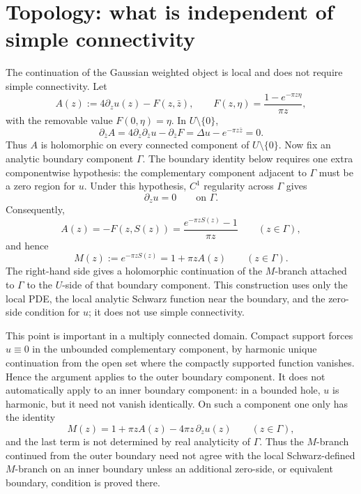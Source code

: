\documentclass[11pt]{article}
\newcommand{\pbar}{\partial_{\bar z}}
\newcommand{\1}{\mathbf 1}
\begin{document}
\section{Topology: what is independent of simple connectivity}

The continuation of the Gaussian weighted object is local and does not require simple
connectivity. Let
\[
  A(z):=4\partial_z u(z)-F(z,\bar z),
  \qquad
  F(z,\eta)=\frac{1-e^{-\pi z\eta}}{\pi z},
\]
with the removable value \(F(0,\eta)=\eta\). In \(U\setminus\{0\}\),
\[
  \pbar A=4\partial_z\pbar u-\pbar F
  =
  \Delta u-e^{-\pi z\bar z}
  =
  0.
\]
Thus \(A\) is holomorphic on every connected component of \(U\setminus\{0\}\). Now fix an
analytic boundary component \(\Gamma\). The boundary identity below requires one extra
componentwise hypothesis: the complementary component adjacent to \(\Gamma\) must be a
zero region for \(u\). Under this hypothesis, \(C^1\) regularity across \(\Gamma\) gives
\[
  \partial_z u=0\qquad\text{on }\Gamma.
\]
Consequently,
\[
  A(z)=-F(z,S(z))
  =
  \frac{e^{-\pi zS(z)}-1}{\pi z}
  \qquad (z\in\Gamma),
\]
and hence
\begin{equation}\label{eq:M-pde-continuation}
  M(z):=e^{-\pi zS(z)}=1+\pi zA(z)
  \qquad (z\in\Gamma).
\end{equation}
The right-hand side gives a holomorphic continuation of the \(M\)-branch attached to
\(\Gamma\) to the \(U\)-side of that boundary component. This construction uses only the
local PDE, the local analytic Schwarz function near the boundary, and the zero-side
condition for \(u\); it does not use simple connectivity.

This point is important in a multiply connected domain. Compact support forces \(u\equiv0\)
in the unbounded complementary component, by harmonic unique continuation from the open
set where the compactly supported function vanishes. Hence the argument applies to the
outer boundary component. It does not automatically apply to an inner boundary component:
in a bounded hole, \(u\) is harmonic, but it need not vanish identically. On such a
component one only has the identity
\[
  M(z)=1+\pi zA(z)-4\pi z\,\partial_z u(z)
  \qquad (z\in\Gamma),
\]
and the last term is not determined by real analyticity of \(\Gamma\). Thus the
\(M\)-branch continued from the outer boundary need not agree with the local
Schwarz-defined \(M\)-branch on an inner boundary unless an additional zero-side, or
equivalent boundary, condition is proved there.
\end{document}
